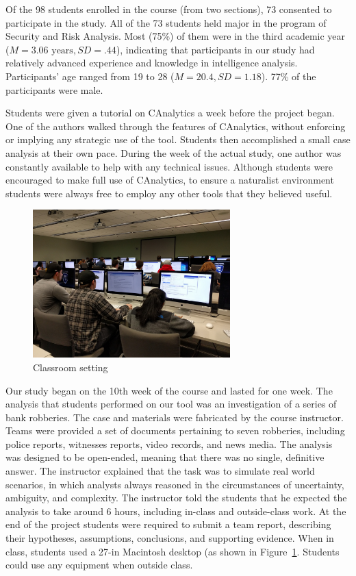  Of the 98 students enrolled in the course (from
 two sections), 73 consented to participate in the study. All of the 73 students
 held major in the program of Security and Risk Analysis. Most (75\%) of them
 were in the third academic year ($M=3.06 \text{ years}, SD=.44$), indicating that participants in
 our study had relatively advanced experience and knowledge in intelligence
 analysis. Participants' age ranged from 19 to 28 ($M=20.4, SD=1.18$). 77\% of the
 participants were male.

 Students were given a tutorial on CAnalytics a week before the project began.
 One of the authors walked through the features of CAnalytics, without enforcing or implying any strategic use of the tool. Students then accomplished a small case analysis at their own pace. During the week of the
 actual study, one author was constantly available to help with any technical
 issues. Although students were encouraged to make full use of CAnalytics, to
 ensure a naturalist environment students were always free to employ any other
 tools that they believed useful.

 \begin{figure}
 	\centering
 	\includegraphics[width=3in]{04-Study_one/img/classroom_setting.jpg}
  \caption{Classroom setting}\label{fig:classroom}
 \end{figure}

Our study began on the 10th week of the course and lasted for one week. The
analysis that students performed on our tool was an investigation of a series
of bank robberies. The case and materials were fabricated by the course instructor. Teams
were provided a set of documents pertaining to seven robberies, including police
reports, witnesses reports, video records, and news media. The analysis was
designed to be open-ended, meaning that there was no single, definitive answer.
The instructor explained that the task was to simulate real world scenarios, in
which analysts always reasoned in the circumstances of uncertainty, ambiguity,
and complexity. The instructor told the students that he expected the analysis
to take around 6 hours, including in-class and outside-class work. At the end of
the project students were required to submit a team report, describing their
hypotheses, assumptions, conclusions, and supporting evidence. When in class, students used a 27-in Macintosh desktop (as shown in Figure~\ref{fig:classroom}. Students could use any equipment when outside class.

